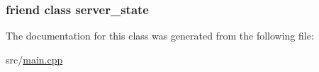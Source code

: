 \subsubsection[{server\+\_\+state}]{\setlength{\rightskip}{0pt plus 5cm}friend class {\bf server\+\_\+state}\hspace{0.3cm}{\ttfamily [friend]}}\label{classexample_1_1connection__state_aa62440ef3586a73e4de6359153ab43f6}


The documentation for this class was generated from the following file\+:\begin{DoxyCompactItemize}
\item 
src/\hyperlink{main_8cpp}{main.\+cpp}\end{DoxyCompactItemize}
